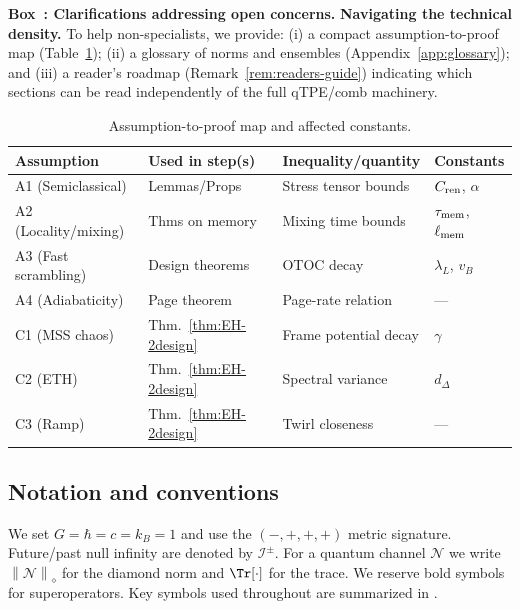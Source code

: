 \documentclass[aps,prd,preprint,onecolumn,superscriptaddress,nofootinbib,longbibliography,floatfix,11pt,showpacs,showkeys]{revtex4-2}
\newcommand{\normD}[1]{\left\lVert #1 \right\rVert_{\diamond}}
\newcommand{\Ddiamond}[1]{\normD{#1}}
\newcounter{boxedresult}
\newenvironment{boxedresult}[1]{\refstepcounter{boxedresult}\begin{infobox}\noindent\textbf{Box~\theboxedresult: #1.}}{\end{infobox}}
\theoremstyle{plain}
\theoremstyle{definition}
\theoremstyle{remark}
\begin{document}
\begin{boxedresult}{Clarifications addressing open concerns}
\medskip
\noindent\textbf{Navigating the technical density.}
To help non-specialists, we provide: (i) a compact assumption-to-proof map (Table~\ref{tab:assumption_map}); (ii) a glossary of norms and ensembles (Appendix~\ref{app:glossary}); and (iii) a reader's roadmap (Remark~\ref{rem:readers-guide}) indicating which sections can be read independently of the full qTPE/comb machinery.
\end{boxedresult}

\begin{table}[h!]
\centering
\caption{Assumption-to-proof map and affected constants.}
\label{tab:assumption_map}
\small
\begin{tabular*}{\textwidth}{@{\extracolsep{\fill}}llll@{}}
\toprule
\textbf{Assumption} & \textbf{Used in step(s)} & \textbf{Inequality/quantity} & \textbf{Constants} \\
\midrule
A1 (Semiclassical) & Lemmas/Props & Stress tensor bounds & $C_{\rm ren}$, $\alpha$ \\
A2 (Locality/mixing) & Thms on memory & Mixing time bounds & $\tau_{\rm mem}$, $\ell_{\rm mem}$ \\
A3 (Fast scrambling) & Design theorems & OTOC decay & $\lambda_L$, $v_B$ \\
A4 (Adiabaticity) & Page theorem & Page-rate relation & --- \\
C1 (MSS chaos) & Thm.~\ref{thm:EH-2design} & Frame potential decay & $\gamma$ \\
C2 (ETH) & Thm.~\ref{thm:EH-2design} & Spectral variance & $d_\Delta$ \\
C3 (Ramp) & Thm.~\ref{thm:EH-2design} & Twirl closeness & --- \\
\bottomrule
\end{tabular*}
\end{table}

\subsection{Notation and conventions}

\label{sec:notation}
We set $G=\hbar=c=k_B=1$ and use the $(-,+,+,+)$ metric signature. Future/past null infinity are denoted by $\mathscr{I}^\pm$. For a quantum channel $\mathcal{N}$ we write $\Ddiamond{\mathcal{N}}$ for the diamond norm and $\Tr[\cdot]$ for the trace. We reserve bold symbols for superoperators. Key symbols used throughout are summarized in .
\end{document}

